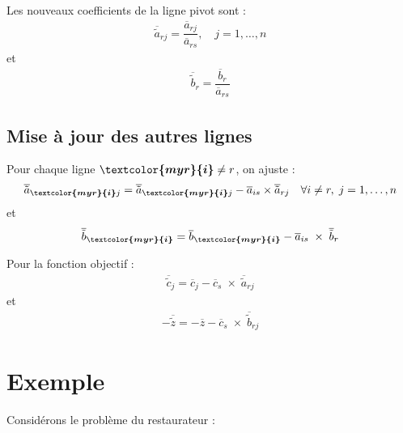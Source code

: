 \documentclass{report}
\begin{document}
\begin{multicols*}{2}
Les nouveaux coefficients de la ligne pivot sont :
\begin{align*}
    \overline{\tilde{a}}_{rj} = \dfrac{\overline{a}_{rj}}{\overline{a}_{rs}},\quad
    j = 1, \dots, n
\end{align*}
et
\begin{align*}
    \overline{\tilde{b}}_r = \dfrac{\overline{b}_r}{\overline{a}_{rs}}
\end{align*}

\subsection{Mise à jour des autres lignes}

Pour chaque ligne $\boldsymbol{\textcolor{myr}{i}} \neq r$, on ajuste :
\begin{align*}
    \overline{\tilde{a}}_{\boldsymbol{\textcolor{myr}{i} }j} = 
    \overline{\tilde{a}}_{\boldsymbol{\textcolor{myr}{i} }j} -  
    \overline{a}_{is} \times \overline{\tilde{a}}_{rj} \quad
    \forall i \neq r, \; j = 1, \dots, n
\end{align*}
et
\begin{align*}
    \overline{\tilde{b}}_{\boldsymbol{\textcolor{myr}{i} }} = 
    \overline{b}_{\boldsymbol{\textcolor{myr}{i} }} 
    - \overline{a}_{is} \; \times \;  \overline{\tilde{b}}_r
\end{align*}

Pour la fonction objectif :
\begin{align*}
    \overline{\tilde{c}}_{j} = 
    \overline{c}_{j} 
    - \overline{c}_{s} \; \times \; \overline{\tilde{a}}_{rj} 
\end{align*}
et
\begin{align*}
    -\overline{\tilde{z}} = -\overline{z} - \overline{c}_s  \; \times \;
    \overline{\tilde{b}}_{rj}
\end{align*}

\section{Exemple}

Considérons le problème du restaurateur :



\end{multicols*}
\end{document}
